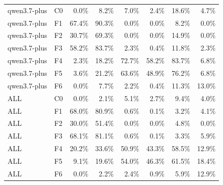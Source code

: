 \begin{tabular}{llrrrrrr}
qwen3.7-plus & C0 & 0.0\% & 8.2\% & 7.0\% & 2.4\% & 18.6\% & 4.7\% \\
qwen3.7-plus & F1 & 67.4\% & 90.3\% & 0.0\% & 0.0\% & 8.2\% & 0.0\% \\
qwen3.7-plus & F2 & 30.7\% & 69.3\% & 0.0\% & 0.0\% & 14.9\% & 0.0\% \\
qwen3.7-plus & F3 & 58.2\% & 83.7\% & 2.3\% & 0.4\% & 11.8\% & 2.3\% \\
qwen3.7-plus & F4 & 2.3\% & 18.2\% & 72.7\% & 58.2\% & 83.7\% & 6.8\% \\
qwen3.7-plus & F5 & 3.6\% & 21.2\% & 63.6\% & 48.9\% & 76.2\% & 6.8\% \\
qwen3.7-plus & F6 & 0.0\% & 7.7\% & 2.2\% & 0.4\% & 11.3\% & 13.0\% \\
ALL & C0 & 0.0\% & 2.1\% & 5.1\% & 2.7\% & 9.4\% & 4.0\% \\
ALL & F1 & 68.0\% & 80.9\% & 0.6\% & 0.1\% & 3.2\% & 4.1\% \\
ALL & F2 & 30.0\% & 51.4\% & 0.0\% & 0.0\% & 4.8\% & 0.0\% \\
ALL & F3 & 68.1\% & 81.1\% & 0.6\% & 0.1\% & 3.3\% & 5.9\% \\
ALL & F4 & 20.2\% & 33.6\% & 50.9\% & 43.3\% & 58.5\% & 12.9\% \\
ALL & F5 & 9.1\% & 19.6\% & 54.0\% & 46.3\% & 61.5\% & 18.4\% \\
ALL & F6 & 0.0\% & 2.2\% & 2.4\% & 0.9\% & 5.9\% & 12.9\% \\
\bottomrule
\end{tabular}

